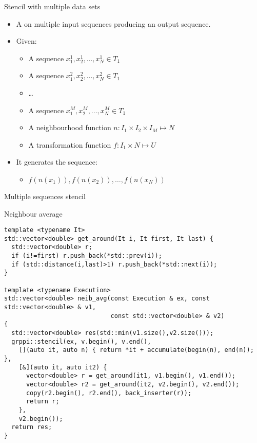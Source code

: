 \begin{frame}[t]{Stencil with multiple data sets}
\begin{itemize}
  \item A  on multiple input sequences producing an output sequence.

  \vfill\pause
  \item Given:
    \begin{itemize}
      \item A sequence $x^1_1, x^1_2, \ldots, x^1_N \in T_1$
      \item A sequence $x^2_1, x^2_2, \ldots, x^2_N \in T_1$
      \item \ldots
      \item A sequence $x^M_1, x^M_2, \ldots, x^M_N \in T_1$
      \item A neighbourhood function $n: I_1 \times I_2 \times I_M \mapsto N$
      \item A transformation function $f: I_1 \times N \mapsto U$
    \end{itemize}

  \vfill\pause
  \item It generates the sequence:
    \begin{itemize}
      \item $f(n(x_1)), f(n(x_2)), \ldots, f(n(x_N))$
    \end{itemize}
\end{itemize}
\end{frame}

\begin{frame}[t,fragile]{Multiple sequences stencil}
\begin{block}{Neighbour average}
\begin{lstlisting}[basicstyle=\tiny]
template <typename It>
std::vector<double> get_around(It i, It first, It last) {
  std::vector<double> r;
  if (i!=first) r.push_back(*std::prev(i));
  if (std::distance(i,last)>1) r.push_back(*std::next(i));
}

template <typename Execution>
std::vector<double> neib_avg(const Execution & ex, const std::vector<double> & v1,
                             const std::vector<double> & v2)
{
  std::vector<double> res(std::min(v1.size(),v2.size()));
  grppi::stencil(ex, v.begin(), v.end(), 
    [](auto it, auto n) { return *it + accumulate(begin(n), end(n)); },
    [&](auto it, auto it2) {
      vector<double> r = get_around(it1, v1.begin(), v1.end());
      vector<double> r2 = get_around(it2, v2.begin(), v2.end());
      copy(r2.begin(), r2.end(), back_inserter(r));
      return r;
    },
    v2.begin());
  return res;
}
\end{lstlisting}
\end{block}
\end{frame}

